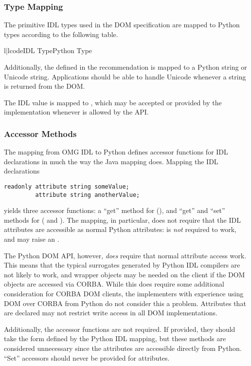 \subsubsection{Type Mapping \label{dom-type-mapping}}

The primitive IDL types used in the DOM specification are mapped to
Python types according to the following table.

\begin{tableii}{l|l}{code}{IDL Type}{Python Type}
\end{tableii}

Additionally, the  defined in the recommendation is
mapped to a Python string or Unicode string.  Applications should
be able to handle Unicode whenever a string is returned from the DOM.

The IDL  value is mapped to , which may be
accepted or provided by the implementation whenever  is
allowed by the API.


\subsubsection{Accessor Methods \label{dom-accessor-methods}}

The mapping from OMG IDL to Python defines accessor functions for IDL
 declarations in much the way the Java mapping
does.  Mapping the IDL declarations

\begin{verbatim}
readonly attribute string someValue;
         attribute string anotherValue;
\end{verbatim}

yields three accessor functions:  a ``get'' method for
 (), and ``get'' and
``set'' methods for
 ( and
).  The mapping, in particular, does not
require that the IDL attributes are accessible as normal Python
attributes:   is \emph{not} required to
work, and may raise an .

The Python DOM API, however, \emph{does} require that normal attribute
access work.  This means that the typical surrogates generated by
Python IDL compilers are not likely to work, and wrapper objects may
be needed on the client if the DOM objects are accessed via CORBA.
While this does require some additional consideration for CORBA DOM
clients, the implementers with experience using DOM over CORBA from
Python do not consider this a problem.  Attributes that are declared
 may not restrict write access in all DOM
implementations.

Additionally, the accessor functions are not required.  If provided,
they should take the form defined by the Python IDL mapping, but
these methods are considered unnecessary since the attributes are
accessible directly from Python.  ``Set'' accessors should never be
provided for  attributes.
